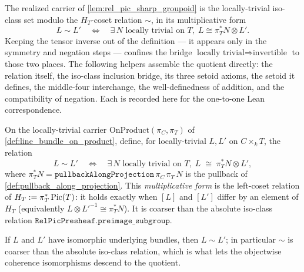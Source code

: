 The realized carrier of \cref{lem:rel_pic_sharp_groupoid} is the
locally-trivial iso-class set modulo the \(H_T\)-coset relation \(\sim\), in
its multiplicative form
\[
  L \sim L' \quad\Longleftrightarrow\quad
    \exists\, N \text{ locally trivial on } T,\;
    L \cong \pi_T^* N \otimes L' .
\]
Keeping the tensor inverse out of the definition --- it appears only in the
symmetry and negation steps --- confines the bridge
\(\text{locally trivial} \Rightarrow \text{invertible}\) to those two
places. The following helpers assemble the quotient directly: the relation
itself, the iso-class inclusion bridge, its three setoid axioms, the setoid it
defines, the middle-four interchange, the well-definedness of addition, and
the compatibility of negation. Each is recorded here for the one-to-one Lean
correspondence.

\begin{definition}\leanok
  \label{lem:relpic_rel}
  On the locally-trivial carrier \(\mathrm{OnProduct}(\pi_C, \pi_T)\) of
  \cref{def:line_bundle_on_product}, define, for locally-trivial \(L, L'\) on
  \(C \times_k T\), the relation
  \[
    L \sim L' \quad\Longleftrightarrow\quad
      \exists\, N \text{ locally trivial on } T,\;
      L \;\cong\; \pi_T^* N \otimes L' ,
  \]
  where \(\pi_T^* N = \mathtt{pullbackAlongProjection}\,\pi_C\,\pi_T\,N\) is the
  pullback of \cref{def:pullback_along_projection}. This \emph{multiplicative
  form} is the left-coset relation of \(H_T := \pi_T^*\operatorname{Pic}(T)\): it holds exactly
  when \([L]\) and \([L']\) differ by an element of \(H_T\) (equivalently
  \(L \otimes L'^{-1} \cong \pi_T^* N\)). It is coarser than the absolute
  iso-class relation \(\mathtt{RelPicPresheaf.preimage\_subgroup}\).
\end{definition}

\begin{lemma}\leanok
  \label{lem:relpic_rel_of_iso}
  If \(L\) and \(L'\) have isomorphic underlying bundles, then \(L \sim L'\); in
  particular \(\sim\) is coarser than the absolute iso-class relation, which is
  what lets the objectwise coherence isomorphisms descend to the quotient.
\end{lemma}

